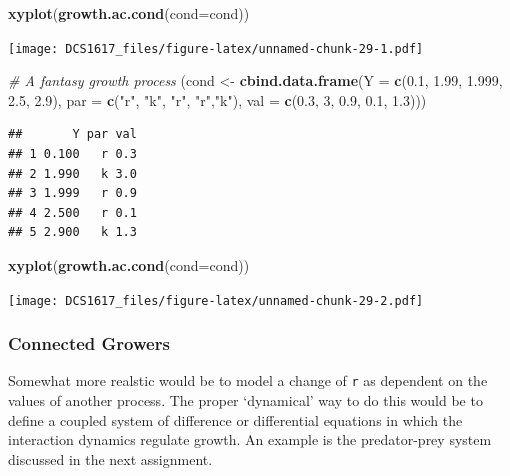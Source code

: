 \documentclass[]{book}
\newenvironment{Shaded}{\begin{snugshade}}{\end{snugshade}}
\newcommand{\KeywordTok}[1]{\textcolor[rgb]{0.13,0.29,0.53}{\textbf{{#1}}}}
\newcommand{\DataTypeTok}[1]{\textcolor[rgb]{0.13,0.29,0.53}{{#1}}}
\newcommand{\DecValTok}[1]{\textcolor[rgb]{0.00,0.00,0.81}{{#1}}}
\newcommand{\FloatTok}[1]{\textcolor[rgb]{0.00,0.00,0.81}{{#1}}}
\newcommand{\StringTok}[1]{\textcolor[rgb]{0.31,0.60,0.02}{{#1}}}
\newcommand{\CommentTok}[1]{\textcolor[rgb]{0.56,0.35,0.01}{\textit{{#1}}}}
\newcommand{\NormalTok}[1]{{#1}}
\begin{document}
\begin{Shaded}
\begin{Highlighting}[]
\KeywordTok{xyplot}\NormalTok{(}\KeywordTok{growth.ac.cond}\NormalTok{(}\DataTypeTok{cond=}\NormalTok{cond))}
\end{Highlighting}
\end{Shaded}

\texttt{[image: DCS1617\_files/figure-latex/unnamed-chunk-29-1.pdf]}

\begin{Shaded}
\begin{Highlighting}[]
\CommentTok{# A fantasy growth process}
\NormalTok{(cond <-}\StringTok{ }\KeywordTok{cbind.data.frame}\NormalTok{(}\DataTypeTok{Y =} \KeywordTok{c}\NormalTok{(}\FloatTok{0.1}\NormalTok{, }\FloatTok{1.99}\NormalTok{, }\FloatTok{1.999}\NormalTok{, }\FloatTok{2.5}\NormalTok{, }\FloatTok{2.9}\NormalTok{), }\DataTypeTok{par =} \KeywordTok{c}\NormalTok{(}\StringTok{"r"}\NormalTok{, }\StringTok{"k"}\NormalTok{, }\StringTok{"r"}\NormalTok{, }\StringTok{"r"}\NormalTok{,}\StringTok{"k"}\NormalTok{), }\DataTypeTok{val =} \KeywordTok{c}\NormalTok{(}\FloatTok{0.3}\NormalTok{, }\DecValTok{3}\NormalTok{, }\FloatTok{0.9}\NormalTok{, }\FloatTok{0.1}\NormalTok{, }\FloatTok{1.3}\NormalTok{)))}
\end{Highlighting}
\end{Shaded}

\begin{verbatim}
##       Y par val
## 1 0.100   r 0.3
## 2 1.990   k 3.0
## 3 1.999   r 0.9
## 4 2.500   r 0.1
## 5 2.900   k 1.3
\end{verbatim}

\begin{Shaded}
\begin{Highlighting}[]
\KeywordTok{xyplot}\NormalTok{(}\KeywordTok{growth.ac.cond}\NormalTok{(}\DataTypeTok{cond=}\NormalTok{cond))}
\end{Highlighting}
\end{Shaded}

\texttt{[image: DCS1617\_files/figure-latex/unnamed-chunk-29-2.pdf]}

\subsubsection*{Connected Growers}\label{connected-growers-1}

Somewhat more realstic would be to model a change of \texttt{r} as
dependent on the values of another process. The proper `dynamical' way
to do this would be to define a coupled system of difference or
differential equations in which the interaction dynamics regulate
growth. An example is the predator-prey system discussed in the next
assignment.
\end{document}
